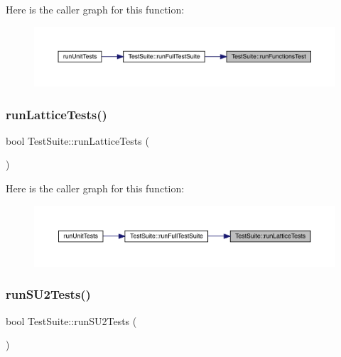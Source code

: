 Here is the caller graph for this function\+:
\nopagebreak
\begin{figure}[H]
\begin{center}
\leavevmode
\includegraphics[width=350pt]{class_test_suite_af257c555a7fff6934523f80b9c59309c_icgraph}
\end{center}
\end{figure}
\mbox{\label{class_test_suite_aa24e7ab393007d18d027fe95c5a3ec58}} 
\subsubsection{\texorpdfstring{runLatticeTests()}{runLatticeTests()}}
{\footnotesize\ttfamily bool Test\+Suite\+::run\+Lattice\+Tests (\begin{DoxyParamCaption}{ }\end{DoxyParamCaption})}

Here is the caller graph for this function\+:
\nopagebreak
\begin{figure}[H]
\begin{center}
\leavevmode
\includegraphics[width=350pt]{class_test_suite_aa24e7ab393007d18d027fe95c5a3ec58_icgraph}
\end{center}
\end{figure}
\mbox{\label{class_test_suite_a904ac34cad4166c281f7dbce9a682b2c}} 
\subsubsection{\texorpdfstring{runSU2Tests()}{runSU2Tests()}}
{\footnotesize\ttfamily bool Test\+Suite\+::run\+S\+U2\+Tests (\begin{DoxyParamCaption}{ }\end{DoxyParamCaption})}

